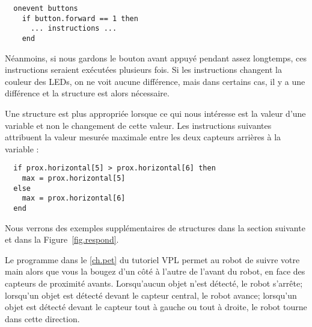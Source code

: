 \begin{footnotesize}
\begin{verbatim}
  onevent buttons
    if button.forward == 1 then
      ... instructions ...
    end
\end{verbatim}
\end{footnotesize}
Néanmoins, si nous gardons le bouton avant appuyé pendant assez longtemps,
ces instructions seraient exécutées plusieurs fois.
Si les instructions changent la couleur des LEDs, on ne voit aucune différence, mais
dans certains cas, il y a une différence et la structure  est alors nécessaire.

Une structure  est plus appropriée lorsque ce qui nous intéresse est la valeur d'une variable
et non le changement de cette valeur.
Les instructions suivantes attribuent la valeur mesurée maximale entre les deux capteurs arrières à la variable :

\begin{footnotesize}
\begin{verbatim}
  if prox.horizontal[5] > prox.horizontal[6] then
    max = prox.horizontal[5]
  else
    max = prox.horizontal[6]
  end
\end{verbatim}
\end{footnotesize}

Nous verrons des exemples supplémentaires de structures  dans la section suivante et
dans la Figure~\ref{fig.respond}.


\newpage




Le programme  dans le \cref{ch.pet} du tutoriel VPL
permet au robot de suivre votre main alors que vous la bougez d'un côté à l'autre de l'avant du robot,
en face des capteurs de proximité avants.
Lorsqu'aucun objet n'est détecté, le robot s'arrête;
lorsqu'un objet est détecté devant le capteur central, le robot avance;
lorsqu'un objet est détecté devant le capteur tout à gauche ou tout à droite,
le robot tourne dans cette direction.

